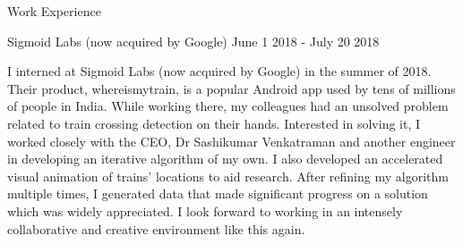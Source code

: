 \documentclass{resume} %
\begin{document}
\begin{rSection}{Work Experience}


\begin{rSubsection}{ Sigmoid Labs (now acquired by Google) }{ June 1 2018 - July 20 2018 }{}
\item I interned at Sigmoid Labs (now acquired by Google) in the summer of 2018. Their product, whereismytrain, is a popular Android app used by tens of millions of people in India. While working there, my colleagues had an unsolved problem related to train crossing detection on their hands. \n Interested in solving it, I worked closely with the CEO, Dr Sashikumar Venkatraman and another engineer in developing an iterative algorithm of my own. I also developed an accelerated visual animation of trains’ locations to aid research. After refining my algorithm multiple times, I generated data that made significant progress on a solution which was widely appreciated. I look forward to working in an intensely collaborative and creative environment like this again.

\end{rSubsection}


\end{rSection}
\end{document}
